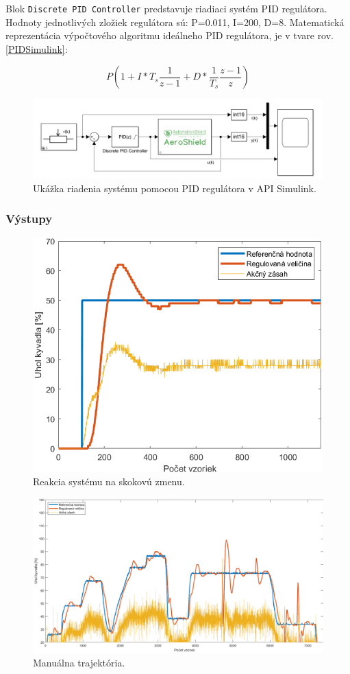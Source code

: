 Blok \verb|Discrete PID Controller| predstavuje riadiaci systém PID regulátora. Hodnoty jednotlivých zložiek regulátora sú: P=0.011, I=200, D=8. Matematická reprezentácia výpočtového algoritmu ideálneho PID regulátora, je v tvare rov.\ref{PIDSimulink}:

\begin{equation}\label{PIDSimulink}
P\left(1+I*T_s\dfrac{1}{z-1}+D*\dfrac{1}{T_s}\dfrac{z-1}{z}\right)
\end{equation}


\begin{figure}[!tbh]
	\centering
	\includegraphics[width=\textwidth]{obr/SimulinkPIDd.png}
	\caption{Ukážka riadenia systému pomocou PID regulátora v API Simulink.}\label{OBRAZOK 2.6.10}
\end{figure}

\subsubsection{Výstupy}

\begin{figure}[!tbh]
	\centering
	\includegraphics[width=120mm]{obr/SimSkok.png}
	\caption{Reakcia systému na skokovú zmenu.}\label{OBRAZOK 2.6.11}
\end{figure}

\begin{figure}[!tbh]
	\centering
	\includegraphics[width=\textwidth]{obr/SimulinkManual.png}
	\caption{Manuálna trajektória.}\label{OBRAZOK 2.6.12}
\end{figure}